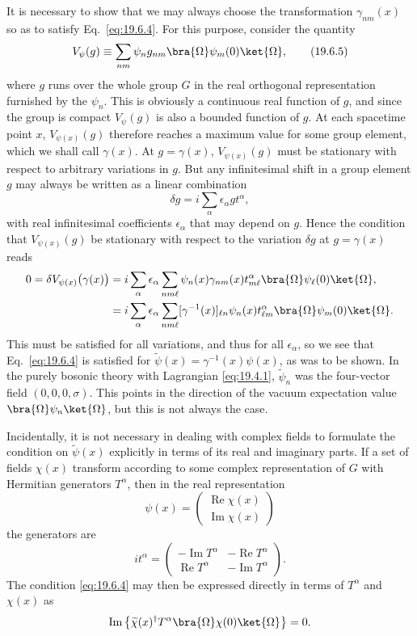 It is necessary to show that we may always choose the transformation $\gamma_{nm}(x)$ so as to satisfy Eq.~\eqref{eq:19.6.4}. For this purpose, consider the quantity
\begin{equation}
V_\psi(g)\equiv
\sum_{nm}\psi_n g_{nm}\bra{\Omega}\psi_m(0)\ket{\Omega},
\tag{19.6.5}\label{eq:19.6.5}
\end{equation}
where $g$ runs over the whole group $G$ in the real orthogonal representation furnished by the $\psi_n$. This is obviously a continuous real function of $g$, and since the group is compact $V_\psi(g)$ is also a bounded function of $g$. At each spacetime point $x$, $V_{\psi(x)}(g)$ therefore reaches a maximum value for some group element, which we shall call $\gamma(x)$. At $g=\gamma(x)$, $V_{\psi(x)}(g)$ must be stationary with respect to arbitrary variations in $g$. But any infinitesimal shift in a group element $g$ may always be written as a linear combination
\[
\delta g=i\sum_\alpha\epsilon_\alpha g t^\alpha,
\]
with real infinitesimal coefficients $\epsilon_\alpha$ that may depend on $g$. Hence the condition that $V_{\psi(x)}(g)$ be stationary with respect to the variation $\delta g$ at $g=\gamma(x)$ reads
\[
\begin{aligned}
0=\delta V_{\psi(x)}\bigl(\gamma(x)\bigr)
&=i\sum_\alpha\epsilon_\alpha
\sum_{nm\ell}\psi_n(x)\gamma_{nm}(x)t^\alpha_{m\ell}
\bra{\Omega}\psi_\ell(0)\ket{\Omega},
\\
&=i\sum_\alpha\epsilon_\alpha
\sum_{nm\ell}[\gamma^{-1}(x)]_{\ell n}\psi_n(x)t^\alpha_{\ell m}
\bra{\Omega}\psi_m(0)\ket{\Omega}.
\end{aligned}
\]
This must be satisfied for all variations, and thus for all $\epsilon_\alpha$, so we see that Eq.~\eqref{eq:19.6.4} is satisfied for $\widetilde\psi(x)=\gamma^{-1}(x)\psi(x)$, as was to be shown. In the purely bosonic theory with Lagrangian \eqref{eq:19.4.1}, $\widetilde\psi_n$ was the four-vector field $(0,0,0,\sigma)$. This points in the direction of the vacuum expectation value $\bra{\Omega}\psi_n\ket{\Omega}$, but this is not always the case.

Incidentally, it is not necessary in dealing with complex fields to formulate the condition on $\widetilde\psi(x)$ explicitly in terms of its real and imaginary parts. If a set of fields $\chi(x)$ transform according to some complex representation of $G$ with Hermitian generators $T^\alpha$, then in the real representation
\[
\psi(x)=
\begin{pmatrix}
\operatorname{Re}\chi(x)\\
\operatorname{Im}\chi(x)
\end{pmatrix}
\]
the generators are
\[
it^\alpha=
\begin{pmatrix}
-\operatorname{Im}T^\alpha&-\operatorname{Re}T^\alpha\\
\operatorname{Re}T^\alpha&-\operatorname{Im}T^\alpha
\end{pmatrix}.
\]
The condition \eqref{eq:19.6.4} may then be expressed directly in terms of $T^\alpha$ and $\chi(x)$ as
\[
\operatorname{Im}\left\{
\widetilde\chi(x)^\dagger T^\alpha
\bra{\Omega}\chi(0)\ket{\Omega}
\right\}=0.
\]

